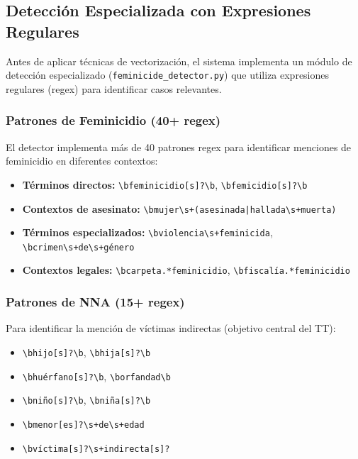 \subsection{Detección Especializada con Expresiones Regulares}
\label{subsec:regex_detector}

Antes de aplicar técnicas de vectorización, el sistema implementa un módulo de detección especializado (\texttt{feminicide\_detector.py}) que utiliza expresiones regulares (regex) para identificar casos relevantes.

\subsubsection{Patrones de Feminicidio (40+ regex)}
\label{subsubsec:patrones_feminicidio}

El detector implementa más de 40 patrones regex para identificar menciones de feminicidio en diferentes contextos:

\begin{itemize}
    \item \textbf{Términos directos:} \texttt{\textbackslash bfeminicidio[s]?\textbackslash b}, \texttt{\textbackslash bfemicidio[s]?\textbackslash b}
    \item \textbf{Contextos de asesinato:} \texttt{\textbackslash bmujer\textbackslash s+(asesinada|hallada\textbackslash s+muerta)}
    \item \textbf{Términos especializados:} \texttt{\textbackslash bviolencia\textbackslash s+feminicida}, \texttt{\textbackslash bcrimen\textbackslash s+de\textbackslash s+género}
    \item \textbf{Contextos legales:} \texttt{\textbackslash bcarpeta.*feminicidio}, \texttt{\textbackslash bfiscalía.*feminicidio}
\end{itemize}

\subsubsection{Patrones de NNA (15+ regex)}
\label{subsubsec:patrones_nna}

Para identificar la mención de víctimas indirectas (objetivo central del TT):

\begin{itemize}
    \item \texttt{\textbackslash bhijo[s]?\textbackslash b}, \texttt{\textbackslash bhija[s]?\textbackslash b}
    \item \texttt{\textbackslash bhuérfano[s]?\textbackslash b}, \texttt{\textbackslash borfandad\textbackslash b}
    \item \texttt{\textbackslash bniño[s]?\textbackslash b}, \texttt{\textbackslash bniña[s]?\textbackslash b}
    \item \texttt{\textbackslash bmenor[es]?\textbackslash s+de\textbackslash s+edad}
    \item \texttt{\textbackslash bvíctima[s]?\textbackslash s+indirecta[s]?}
\end{itemize}

